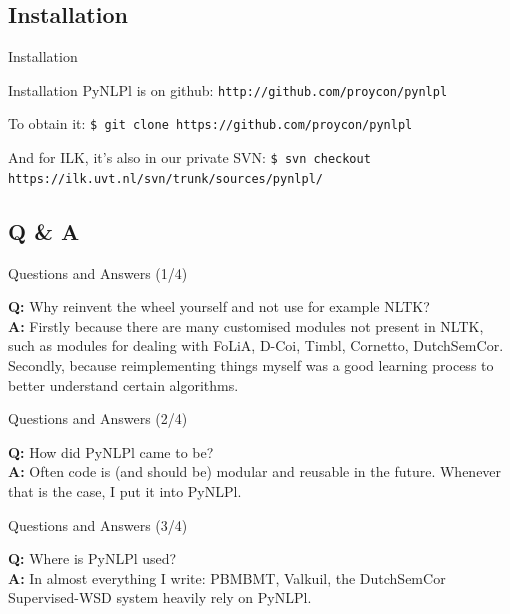 \documentclass[compress]{beamer}
\begin{document}
\subsection{Installation}

\begin{frame}{Installation}

    \begin{block}{Installation}
        PyNLPl is on github:        
        \texttt{http://github.com/proycon/pynlpl}
        
        To obtain it: 
        \texttt{\$ git clone https://github.com/proycon/pynlpl}
        
        And for ILK, it's also in our private SVN:
        \texttt{\$ svn checkout https://ilk.uvt.nl/svn/trunk/sources/pynlpl/}
    \end{block}

\end{frame}

\subsection{Q \& A}

\begin{frame}{Questions and Answers (1/4)}

        \textbf{Q:} Why reinvent the wheel yourself and not use for example NLTK? \\
        \textbf{A:} Firstly because there are many customised modules not present in NLTK, such as modules for dealing with FoLiA, D-Coi, Timbl, Cornetto, DutchSemCor. Secondly, because reimplementing things myself was a good learning process to better understand certain algorithms.
\end{frame}


\begin{frame}{Questions and Answers (2/4)}
        
        \textbf{Q:} How did PyNLPl came to be? \\
        \textbf{A:} Often code is (and should be) modular and reusable in the future. Whenever that is the case, I put it into PyNLPl.
\end{frame}

\begin{frame}{Questions and Answers (3/4)}
        
        \textbf{Q:} Where is PyNLPl used? \\
        \textbf{A:} In almost everything I write: PBMBMT, Valkuil, the DutchSemCor Supervised-WSD system heavily rely on PyNLPl.
\end{frame}
        
\end{document}
